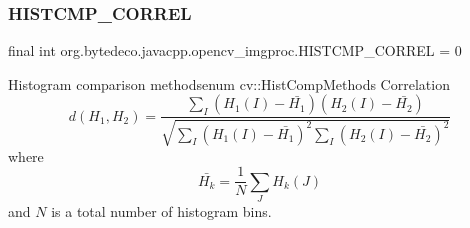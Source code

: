 \subsubsection{\texorpdfstring{H\+I\+S\+T\+C\+M\+P\+\_\+\+C\+O\+R\+R\+EL}{HISTCMP\_CORREL}}
{\footnotesize\ttfamily final int org.\+bytedeco.\+javacpp.\+opencv\+\_\+imgproc.\+H\+I\+S\+T\+C\+M\+P\+\_\+\+C\+O\+R\+R\+EL = 0\hspace{0.3cm}{\ttfamily [static]}}

Histogram comparison methodsenum cv\+::\+Hist\+Comp\+Methods Correlation \[d(H_1,H_2) = \frac{\sum_I (H_1(I) - \bar{H_1}) (H_2(I) - \bar{H_2})}{\sqrt{\sum_I(H_1(I) - \bar{H_1})^2 \sum_I(H_2(I) - \bar{H_2})^2}}\] where \[\bar{H_k} = \frac{1}{N} \sum _J H_k(J)\] and $N$ is a total number of histogram bins. 